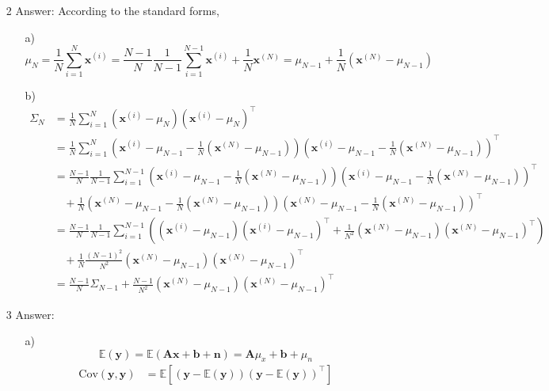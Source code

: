\documentclass{article}
\begin{document}
\begin{itemize}
\item[2] Answer: According to the standard forms, 
	\begin{itemize}
	\item[a)] $$\mu_N = \frac{1}{N}\sum_{i=1}^N \mathbf{x}^{(i)} = \frac{N-1}{N} \frac{1}{N-1}\sum_{i=1}^{N-1} \mathbf{x}^{(i)} + \frac{1}{N}\mathbf{x}^{(N)}=\mu_{N-1} + \frac{1}{N} (\mathbf{x}^{(N)}-\mu_{N-1})$$
	\item[b)] 
	\begin{equation*}
	\begin{split}
	\Sigma_N &= \frac{1}{N}\sum_{i=1}^N (\mathbf{x}^{(i)} - \mu_N)(\mathbf{x}^{(i)} - \mu_N)^\top \\
	&= \frac{1}{N}\sum_{i=1}^N \left(\mathbf{x}^{(i)} - \mu_{N-1} - \frac{1}{N} (\mathbf{x}^{(N)}-\mu_{N-1}) \right)\left(\mathbf{x}^{(i)} - \mu_{N-1} - \frac{1}{N} (\mathbf{x}^{(N)}-\mu_{N-1}) \right)^\top \\
	&= \frac{N-1}{N} \frac{1}{N-1} \sum_{i=1}^{N-1} \left(\mathbf{x}^{(i)} - \mu_{N-1} - \frac{1}{N} (\mathbf{x}^{(N)}-\mu_{N-1}) \right)\left(\mathbf{x}^{(i)} - \mu_{N-1} - \frac{1}{N} (\mathbf{x}^{(N)}-\mu_{N-1}) \right)^\top \\&\ \ \ \ + \frac{1}{N} \left(\mathbf{x}^{(N)} - \mu_{N-1} - \frac{1}{N} (\mathbf{x}^{(N)}-\mu_{N-1}) \right)\left(\mathbf{x}^{(N)} - \mu_{N-1} - \frac{1}{N} (\mathbf{x}^{(N)}-\mu_{N-1}) \right)^\top\\
	&= \frac{N-1}{N} \frac{1}{N-1} \sum_{i=1}^{N-1} \left((\mathbf{x}^{(i)} - \mu_{N-1})(\mathbf{x}^{(i)} - \mu_{N-1})^\top + \frac{1}{N^2}  (\mathbf{x}^{(N)}-\mu_{N-1}) (\mathbf{x}^{(N)}-\mu_{N-1})^\top  \right)\\&\ \ \ \ + \frac{1}{N} \frac{(N-1)^2}{N^2}\left(\mathbf{x}^{(N)} - \mu_{N-1}\right)\left(\mathbf{x}^{(N)} - \mu_{N-1} \right)^\top\\
	&= \frac{N-1}{N} \Sigma_{N-1} + \frac{N-1}{N^2}\left(\mathbf{x}^{(N)} - \mu_{N-1}\right)\left(\mathbf{x}^{(N)} - \mu_{N-1} \right)^\top
	\end{split}
	\end{equation*}
	\end{itemize}
\item[3] Answer:
	\begin{itemize}
	\item[a)] $$\mathbb{E}(\mathbf{y}) = \mathbb{E}(\mathbf{A}\mathbf{x}+\mathbf{b}+\mathbf{n})= \mathbf{A}\mu_x+\mathbf{b}+\mu_n$$
	\begin{equation*}
	\begin{split}
	\text{Cov}(\mathbf{y},\mathbf{y}) &= \mathbb{E}\left[\left(\mathbf{y} - \mathbb{E}(\mathbf{y}) \right) \left(\mathbf{y} - \mathbb{E}(\mathbf{y}) \right)^\top \right] \\

\end{split}
\end{equation*}
\end{itemize}
\end{itemize}
\end{document}
